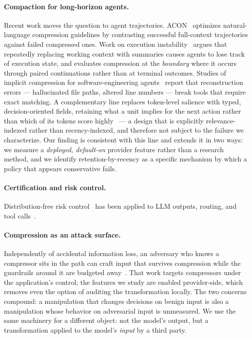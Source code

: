 \documentclass[11pt]{article}
\begin{document}
\paragraph{Compaction for long-horizon agents.}
Recent work moves the question to agent trajectories. ACON~\cite{acon} optimizes
natural-language compression guidelines by contrasting successful full-context
trajectories against failed compressed ones. Work on execution
instability~\cite{trace} argues
that repeatedly replacing working context with summaries causes agents to lose
track of execution state, and evaluates compression at the \emph{boundary} where
it occurs through paired continuations rather than at terminal outcomes. Studies of
implicit compression for software-engineering agents~\cite{implicitswe} report
that reconstruction errors --- hallucinated file paths, altered line numbers --- break tools that
require exact matching. A complementary line replaces token-level salience with
typed, decision-oriented fields, retaining what a unit implies for the next action
rather than which of its tokens score highly~\cite{damc} --- a design that is
explicitly relevance-indexed rather than recency-indexed, and therefore not subject
to the failure we characterize. Our finding is consistent with this line and extends it in
two ways: we measure a \emph{deployed, default-on} provider feature rather than a
research method, and we identify retention-by-recency as a specific mechanism by
which a policy that appears conservative fails.

\paragraph{Certification and risk control.}
Distribution-free risk control~\cite{crc,ltt} has been applied to LLM outputs,
routing, and tool calls~\cite{rolestrat}.

\paragraph{Compression as an attack surface.}
Independently of accidental information loss, an adversary who knows a compressor
sits in the path can craft input that survives compression while the guardrails
around it are budgeted away~\cite{coma}. That work targets compressors under the
application's control; the features we study are enabled provider-side, which
removes even the option of auditing the transformation locally. The two concerns
compound: a manipulation that changes decisions on benign input is also a
manipulation whose behavior on adversarial input is unmeasured. We use the same machinery for a different object: not the model's output,
but a transformation applied to the model's \emph{input} by a third party.
\end{document}
